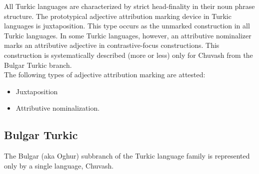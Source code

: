\noindent All Turkic languages are characterized by strict head-finality in their noun phrase structure. The prototypical adjective attribution marking device in Turkic languages is juxtaposition. This type occurs as the unmarked construction in all Turkic languages. In some Turkic languages, however, an attributive nominalizer marks an attributive adjective in contrastive-focus constructions. This construction is systematically described (more or less) only for Chuvash from the Bulgar Turkic branch.\\

\noindent The following types of adjective attribution marking are attested:
\begin{itemize}
\item Juxtaposition
\item Attributive nominalization.
\end{itemize}

\subsection{Bulgar Turkic}
The Bulgar (aka Oghur) subbranch of the Turkic language family is represented only by a single language, Chuvash.

